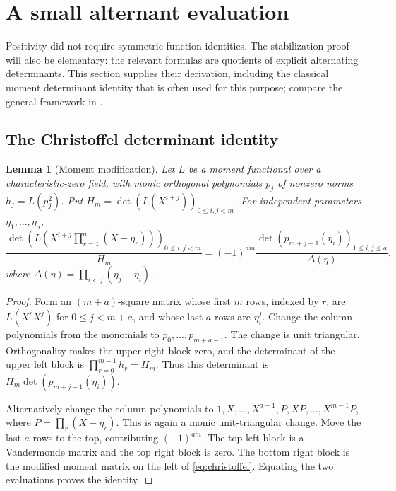 \documentclass[11pt]{article}
\newtheorem{lemma}[theorem]{Lemma}
\theoremstyle{definition}
\theoremstyle{remark}
\newcommand{\Dlt}{\Delta}
\theoremstyle{definition}
\theoremstyle{plain}
\numberwithin{equation}{section}
\begin{document}
\section{A small alternant evaluation}
\label{sec:alternants}

Positivity did not require symmetric-function identities. The stabilization
proof will also be elementary: the relevant formulas are quotients of
explicit alternating determinants. This section supplies their derivation,
including the classical moment determinant identity that is often used for
this purpose; compare the general framework in \cite{CK}.

\subsection{The Christoffel determinant identity}
\begin{lemma}[Moment modification]
\label{lem:christoffel}
Let $L$ be a moment functional over a characteristic-zero field, with monic
orthogonal polynomials $p_j$ of nonzero norms $h_j=L(p_j^2)$.
Put $H_m=\det(L(X^{i+j}))_{0\le i,j<m}$.
For independent parameters $\eta_1,\ldots,\eta_a$,
\begin{equation}
 \frac{\det\left(L\left(X^{i+j}\prod_{r=1}^a(X-\eta_r)\right)\right)_{0\le i,j<m}}{H_m}
 =(-1)^{am}
 \frac{\det(p_{m+j-1}(\eta_i))_{1\le i,j\le a}}
 {\Dlt(\eta)},
 \label{eq:christoffel}
\end{equation}
where $\Dlt(\eta)=\prod_{i<j}(\eta_j-\eta_i)$.
\end{lemma}
\begin{proof}
Form an $(m+a)$-square matrix whose first $m$ rows, indexed by $r$, are
$L(X^r X^j)$ for $0\le j<m+a$, and whose last $a$ rows are
$\eta_i^j$. Change the column polynomials from the monomials to
$p_0,\ldots,p_{m+a-1}$. The change is unit triangular. Orthogonality makes
the upper right block zero, and the determinant of the upper left block is
$\prod_{r=0}^{m-1}h_r=H_m$. Thus this determinant is
$H_m\det(p_{m+j-1}(\eta_i))$.

Alternatively change the column polynomials to
$1,X,\ldots,X^{a-1},P,XP,\ldots,X^{m-1}P$, where
$P=\prod_r(X-\eta_r)$. This is again a monic unit-triangular change.
Move the last $a$ rows to the top, contributing $(-1)^{am}$.
The top left block is a Vandermonde matrix and the top right block is zero.
The bottom right block is the modified moment matrix on the left of
\eqref{eq:christoffel}. Equating the two evaluations proves the identity.
\end{proof}
\end{document}
